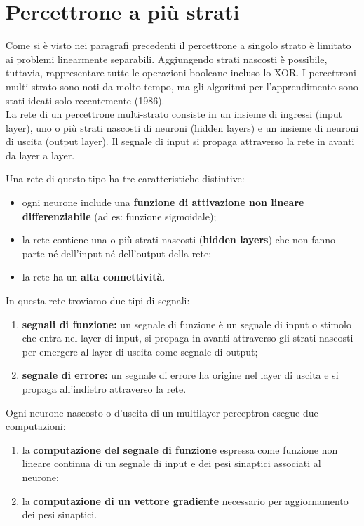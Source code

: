 \section{Percettrone a più strati} %
\label{sec:percettrone_a_più_strati}
Come si è visto nei paragrafi precedenti il percettrone a singolo strato è limitato ai problemi linearmente separabili. Aggiungendo strati nascosti è possibile, tuttavia, rappresentare tutte le operazioni booleane incluso lo XOR. I percettroni multi-strato sono noti da molto tempo, ma gli algoritmi per l'apprendimento sono stati ideati solo recentemente (1986).\\

La rete di un percettrone multi-strato consiste in un insieme di ingressi (input layer), uno o più strati nascosti di neuroni (hidden layers) e un insieme di neuroni di uscita (output layer). Il segnale di input si propaga attraverso la rete in avanti da layer a layer.

\newpage

Una rete di questo tipo ha tre caratteristiche distintive:
\begin{itemize}
    \item ogni neurone include una \textbf{funzione di attivazione non lineare differenziabile }(ad es: funzione
sigmoidale);
    \item la rete contiene una o più strati nascosti (\textbf{hidden layers}) che non fanno parte né dell'input né
dell'output della rete;
    \item la rete ha un \textbf{alta connettività}.
\end{itemize}
In questa rete troviamo due tipi di segnali:
\begin{enumerate}
    \item \textbf{segnali di funzione: }un segnale di funzione è un segnale di input o stimolo che entra nel layer di input, si propaga in avanti attraverso gli strati nascosti per emergere al layer di uscita come segnale di output;
    \item \textbf{segnale di errore:} un segnale di errore ha origine nel layer di uscita e si propaga all'indietro attraverso la rete.
\end{enumerate}

Ogni neurone nascosto o d'uscita di un multilayer perceptron esegue due computazioni:
\begin{enumerate}
    \item la \textbf{computazione del segnale di funzione} espressa come funzione non lineare continua
di un segnale di input e dei pesi sinaptici associati al neurone;
    \item la \textbf{computazione di un vettore gradiente} necessario per aggiornamento dei pesi
sinaptici.
\end{enumerate}


